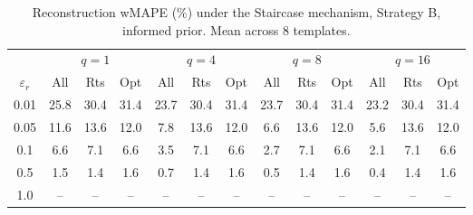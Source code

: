 \begin{table}[h]
\centering
\setlength{\tabcolsep}{2.5pt}
\small
\caption{Reconstruction wMAPE (\%) under the Staircase mechanism, Strategy B, informed prior. Mean across 8 templates.}
\label{tab:rq2_stair_agg}
\begin{tabular}{c|ccc|ccc|ccc|ccc}
\toprule
 & \multicolumn{3}{c|}{$q=1$} & \multicolumn{3}{c|}{$q=4$} & \multicolumn{3}{c|}{$q=8$} & \multicolumn{3}{c}{$q=16$} \\
$\varepsilon_r$ & All & Rts & Opt & All & Rts & Opt & All & Rts & Opt & All & Rts & Opt \\
\midrule
0.01 & 25.8 & 30.4 & 31.4 & 23.7 & 30.4 & 31.4 & 23.7 & 30.4 & 31.4 & 23.2 & 30.4 & 31.4 \\
0.05 & 11.6 & 13.6 & 12.0 & 7.8 & 13.6 & 12.0 & 6.6 & 13.6 & 12.0 & 5.6 & 13.6 & 12.0 \\
0.1 & 6.6 & 7.1 & 6.6 & 3.5 & 7.1 & 6.6 & 2.7 & 7.1 & 6.6 & 2.1 & 7.1 & 6.6 \\
0.5 & 1.5 & 1.4 & 1.6 & 0.7 & 1.4 & 1.6 & 0.5 & 1.4 & 1.6 & 0.4 & 1.4 & 1.6 \\
1.0 & -- & -- & -- & -- & -- & -- & -- & -- & -- & -- & -- & -- \\
\bottomrule
\end{tabular}
\end{table}
